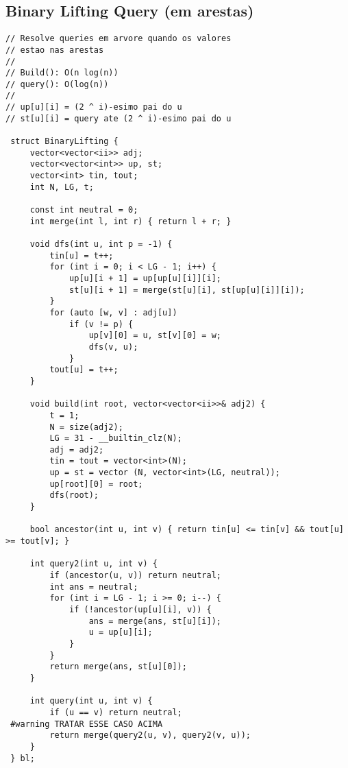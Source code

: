 \documentclass[11pt, a4paper, twoside]{article}
\begin{document}
\subsection{Binary Lifting Query (em arestas)}
\begin{lstlisting}
// Resolve queries em arvore quando os valores
// estao nas arestas
//
// Build(): O(n log(n))
// query(): O(log(n))
//
// up[u][i] = (2 ^ i)-esimo pai do u
// st[u][i] = query ate (2 ^ i)-esimo pai do u

 struct BinaryLifting {
     vector<vector<ii>> adj;
     vector<vector<int>> up, st;
     vector<int> tin, tout;
     int N, LG, t;
 
     const int neutral = 0;
     int merge(int l, int r) { return l + r; }
 
     void dfs(int u, int p = -1) {
         tin[u] = t++;
         for (int i = 0; i < LG - 1; i++) {
             up[u][i + 1] = up[up[u][i]][i];
             st[u][i + 1] = merge(st[u][i], st[up[u][i]][i]);
         }
         for (auto [w, v] : adj[u])
             if (v != p) {
                 up[v][0] = u, st[v][0] = w;
                 dfs(v, u);
             }
         tout[u] = t++;
     }
 
     void build(int root, vector<vector<ii>>& adj2) {
         t = 1;
         N = size(adj2);
         LG = 31 - __builtin_clz(N);
         adj = adj2;
         tin = tout = vector<int>(N);
         up = st = vector (N, vector<int>(LG, neutral));
         up[root][0] = root;
         dfs(root);
     }
 
     bool ancestor(int u, int v) { return tin[u] <= tin[v] && tout[u] >= tout[v]; }
 
     int query2(int u, int v) {
         if (ancestor(u, v)) return neutral;
         int ans = neutral;
         for (int i = LG - 1; i >= 0; i--) {
             if (!ancestor(up[u][i], v)) {
                 ans = merge(ans, st[u][i]);
                 u = up[u][i];
             }
         }
         return merge(ans, st[u][0]);
     }
 
     int query(int u, int v) {
         if (u == v) return neutral;
 #warning TRATAR ESSE CASO ACIMA
         return merge(query2(u, v), query2(v, u));
     }
 } bl;
 
\end{lstlisting}
\end{document}
